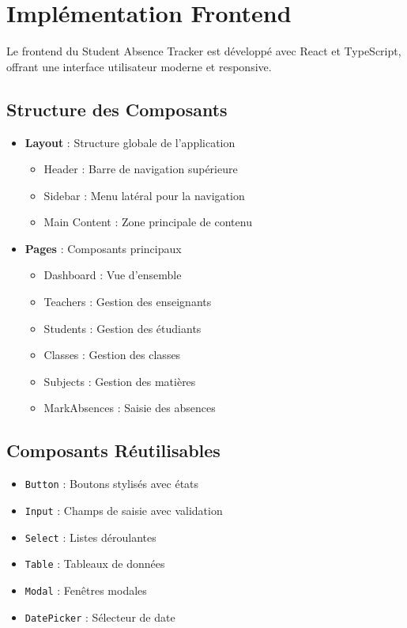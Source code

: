 \section{Implémentation Frontend}
\label{sec:frontend}

Le frontend du Student Absence Tracker est développé avec React et TypeScript, offrant une interface utilisateur moderne et responsive.

\subsection{Structure des Composants}
\begin{itemize}
    \item \textbf{Layout} : Structure globale de l'application
    \begin{itemize}
        \item Header : Barre de navigation supérieure
        \item Sidebar : Menu latéral pour la navigation
        \item Main Content : Zone principale de contenu
    \end{itemize}
    \item \textbf{Pages} : Composants principaux
    \begin{itemize}
        \item Dashboard : Vue d'ensemble
        \item Teachers : Gestion des enseignants
        \item Students : Gestion des étudiants
        \item Classes : Gestion des classes
        \item Subjects : Gestion des matières
        \item MarkAbsences : Saisie des absences
    \end{itemize}
\end{itemize}

\subsection{Composants Réutilisables}
\begin{itemize}
    \item \texttt{Button} : Boutons stylisés avec états
    \item \texttt{Input} : Champs de saisie avec validation
    \item \texttt{Select} : Listes déroulantes
    \item \texttt{Table} : Tableaux de données
    \item \texttt{Modal} : Fenêtres modales
    \item \texttt{DatePicker} : Sélecteur de date
\end{itemize}

